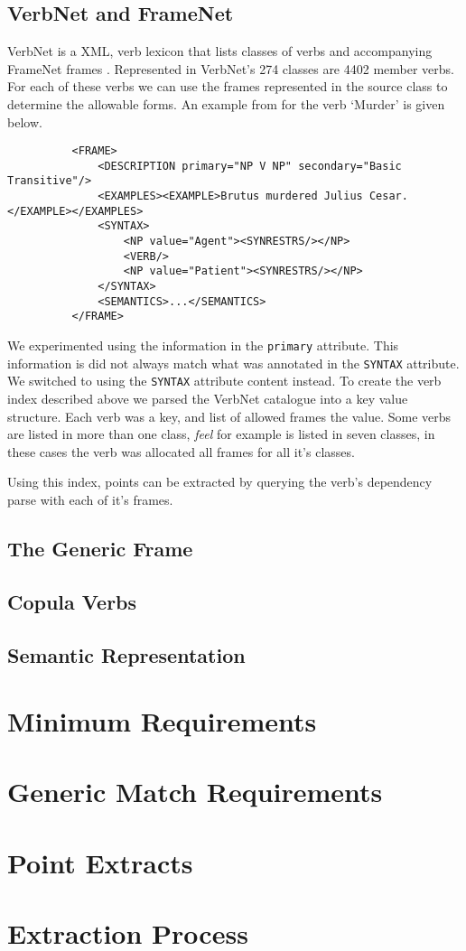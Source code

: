     \subsection{VerbNet and FrameNet}
      VerbNet is a XML, verb lexicon that lists classes of verbs and accompanying FrameNet \cite{fillmore2002framenet} frames \cite{schuler2005verbnet}. Represented in VerbNet's 274 classes are 4402 member verbs. For each of these verbs we can use the frames represented in the source class to determine the allowable forms. An example from for the verb `Murder' is given below.

      \lstset{language=XML}
      \begin{lstlisting}
          <FRAME>
              <DESCRIPTION primary="NP V NP" secondary="Basic Transitive"/>
              <EXAMPLES><EXAMPLE>Brutus murdered Julius Cesar.</EXAMPLE></EXAMPLES>
              <SYNTAX>
                  <NP value="Agent"><SYNRESTRS/></NP>
                  <VERB/>
                  <NP value="Patient"><SYNRESTRS/></NP>
              </SYNTAX>
              <SEMANTICS>...</SEMANTICS>
          </FRAME>
      \end{lstlisting}

      We experimented using the information in the \texttt{primary} attribute. This information is did not always match what was annotated in the \texttt{SYNTAX} attribute. We switched to using the \texttt{SYNTAX} attribute content instead. To create the verb index described above we parsed the VerbNet catalogue into a key value structure. Each verb was a key, and list of allowed frames the value. Some verbs are listed in more than one class, \textit{feel} for example is listed in seven classes, in these cases the verb was allocated all frames for all it's classes.

      Using this index, points can be extracted by querying the verb's dependency parse with each of it's frames.

    \subsection{The Generic Frame}
    \subsection{Copula Verbs}
    \subsection{Semantic Representation}
  \section{Minimum Requirements}
    \section{Generic Match Requirements}
  \section{Point Extracts}
  \section{Extraction Process}
